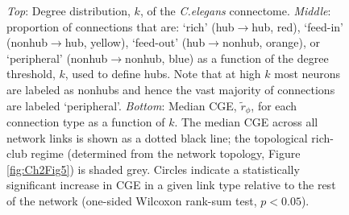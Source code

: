 \begin{figure}[!h]
{\emph{Top}: Degree distribution, $k$, of the \emph{C.elegans} connectome.
\emph{Middle}: proportion of connections that are:
`rich' (hub$\rightarrow$hub, red),
`feed-in' (nonhub$\rightarrow$hub, yellow),
`feed-out' (hub$\rightarrow$nonhub, orange), or
`peripheral' (nonhub$\rightarrow$nonhub, blue) as a function of the degree threshold, $k$, used to define hubs.
Note that at high $k$ most neurons are labeled as nonhubs and hence the vast majority of connections are labeled `peripheral'.
 \emph{Bottom}: Median CGE, $\tilde{r}_\phi$, for each connection type as a function of $k$.
The median CGE across all network links is shown as a dotted black line; the topological rich-club regime (determined from the network topology, Figure \ref{fig:Ch2Fig5}) is shaded grey.
Circles indicate a statistically significant increase in CGE in a given link type relative to the rest of the network (one-sided Wilcoxon rank-sum test, $p < 0.05$).
}
 \label{fig:Ch2Fig6}
\end{figure}

